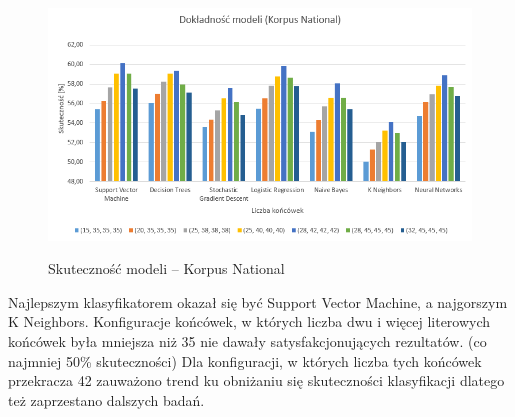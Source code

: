 \begin{figure}[!htbp]
	\centering
	\includegraphics[scale=0.8]{korpusnationalwykres}
	\label{Rysunek}
	\caption{Skuteczność modeli -- Korpus National}
\end{figure}

Najlepszym klasyfikatorem okazał się być Support Vector Machine, a najgorszym K Neighbors. Konfiguracje końcówek, w których liczba dwu i więcej literowych końcówek była mniejsza niż 35 nie dawały satysfakcjonujących rezultatów. (co najmniej 50\% skuteczności) Dla konfiguracji, w których liczba tych końcówek przekracza 42 zauważono trend ku obniżaniu się skuteczności klasyfikacji dlatego też zaprzestano dalszych badań.
